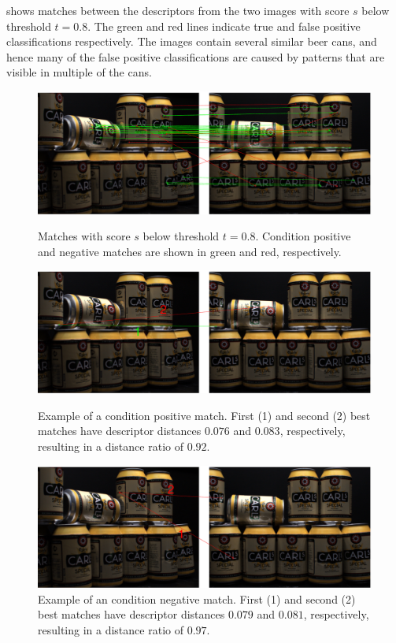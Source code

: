 \documentclass[thesis.tex]{subfiles}
\begin{document}
 shows matches between the descriptors from the two images with score $s$ below threshold $t = 0.8$. The green and red lines indicate true and false positive classifications respectively. The images contain several similar beer cans, and hence many of the false positive classifications are caused by patterns that are visible in multiple of the cans.
%
\begin{figure}[p]
	\centerline{\includegraphics[width=1.1\textwidth]{img/imageCorrespondenceMatches.pdf}}
	\caption{Matches with score $s$ below threshold $t = 0.8$. Condition positive and negative matches are shown in green and red, respectively.}
	\label{fig:imageCorrespondenceMatches}
	\vspace{5mm}
	\centerline{\includegraphics[width=1.1\textwidth]{img/imageCorrespondenceCorrectMatch.pdf}}
	\caption{Example of a condition positive match. First (1) and second (2) best matches have descriptor distances $0.076$ and $0.083$, respectively, resulting in a distance ratio of $0.92$.}
	\label{fig:imageCorrespondenceCorrectMatch}
	\vspace{5mm}
	\centerline{\includegraphics[width=1.1\textwidth]{img/imageCorrespondenceIncorrectMatch.pdf}}
	\caption{Example of an condition negative match. First (1) and second (2) best matches have descriptor distances $0.079$ and $0.081$, respectively, resulting in a distance ratio of $0.97$.}
	\label{fig:imageCorrespondenceIncorrectMatch}
\end{figure}
\end{document}
